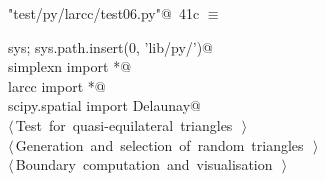 \documentclass[11pt,oneside]{article}	%
\begin{document}
\begin{flushleft} \small
\begin{minipage}{\linewidth} \label{scrap87}
\protect{}\verb@"test/py/larcc/test06.py"@\nobreak\ {\footnotesize 41c }$\equiv$
\vspace{-1ex}
\begin{list}{}{} \item
\mbox{}\verb@import sys; sys.path.insert(0, 'lib/py/')@\\
\mbox{}\verb@from simplexn import *@\\
\mbox{}\verb@from larcc import *@\\
\mbox{}\verb@from scipy.spatial import Delaunay@\\
\mbox{}\verb@@\hbox{$\langle\,$Test for quasi-equilateral triangles\nobreak\ {\footnotesize {}}$\,\rangle$}\verb@@\\
\mbox{}\verb@@\hbox{$\langle\,$Generation and selection of random triangles\nobreak\ {\footnotesize {}}$\,\rangle$}\verb@@\\
\mbox{}\verb@@\hbox{$\langle\,$Boundary computation and visualisation\nobreak\ {\footnotesize {}}$\,\rangle$}\verb@@\\
\mbox{}\verb@@{\NWsep}
\end{list}
\vspace{-2ex}
\end{minipage}\\[4ex]
\end{flushleft}
\end{document}
